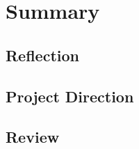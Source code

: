 \section{Summary}
\label{sec:summary}

\subsection{Reflection}

\subsection{Project Direction}

\subsection{Review}
